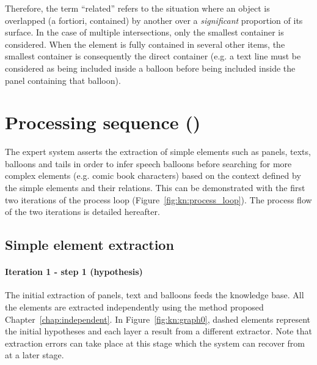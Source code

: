 Therefore, the term ``related'' refers to the situation where an object is overlapped (a fortiori, contained) by another over a \emph{significant} proportion of its surface.
In the case of multiple intersections, only the smallest container is considered.
When the element is fully contained in several other items, the smallest container is consequently the direct container (e.g. a text line must be considered as being included inside a balloon before being included inside the panel containing that balloon).

\section{Processing sequence ()} %
\label{sec:kn:framework_}


The expert system asserts the extraction of simple elements such as panels, texts, balloons and tails in order to infer speech balloons before searching for more complex elements (e.g. comic book characters) based on the context defined by the simple elements and their relations.
This can be demonstrated with the first two iterations of the process loop (Figure~\ref{fig:kn:process_loop}).
The process flow of the two iterations is detailed hereafter.

\subsection{Simple element extraction} %
\label{sub:simple_element_extraction}

\paragraph{Iteration 1 - step 1 (hypothesis)} %
\label{par:step_1}
The initial extraction of panels, text and balloons feeds the knowledge base.
All the elements are extracted independently using the method proposed Chapter~\ref{chap:independent}.
In Figure~\ref{fig:kn:graph0}, dashed elements represent the initial hypotheses and each layer a result from a different extractor.
Note that extraction errors can take place at this stage which the system can recover from at a later stage.


